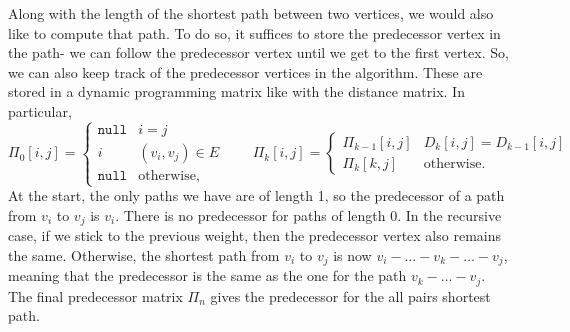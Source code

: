 \documentclass[a4paper, openany]{memoir}
\begin{document}
    Along with the length of the shortest path between two vertices, we would also like to compute that path. To do so, it suffices to store the predecessor vertex in the path- we can follow the predecessor vertex until we get to the first vertex. So, we can also keep track of the predecessor vertices in the algorithm. These are stored in a dynamic programming matrix like with the distance matrix. In particular, 
    \[\Pi_0[i, j] = \begin{cases}
        \texttt{null} & i = j \\
        i & (v_i, v_j) \in E \\
        \texttt{null} & \text{otherwise},
    \end{cases} \qquad \Pi_k[i, j] = \begin{cases}
        \Pi_{k-1}[i, j] & D_k[i, j] = D_{k-1}[i, j] \\
        \Pi_k[k, j] & \text{otherwise}.
    \end{cases}\]
    At the start, the only paths we have are of length 1, so the predecessor of a path from $v_i$ to $v_j$ is $v_i$. There is no predecessor for paths of length 0. In the recursive case, if we stick to the previous weight, then the predecessor vertex also remains the same. Otherwise, the shortest path from $v_i$ to $v_j$ is now $v_i - \dots - v_k - \dots - v_j$, meaning that the predecessor is the same as the one for the path $v_k - \dots - v_j$. The final predecessor matrix $\Pi_n$ gives the predecessor for the all pairs shortest path.
\end{document}
